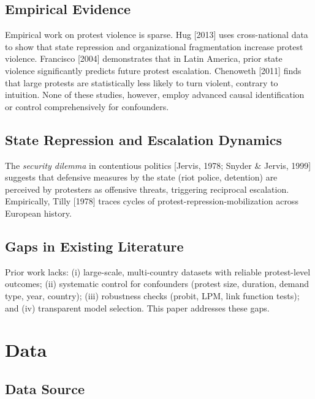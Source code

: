\documentclass[11pt,a4paper]{article}
\begin{document}
\subsection{Empirical Evidence}

Empirical work on protest violence is sparse. Hug [2013] uses cross-national data to show that state repression and organizational fragmentation increase protest violence. Francisco [2004] demonstrates that in Latin America, prior state violence significantly predicts future protest escalation. Chenoweth [2011] finds that large protests are statistically less likely to turn violent, contrary to intuition. None of these studies, however, employ advanced causal identification or control comprehensively for confounders.

\subsection{State Repression and Escalation Dynamics}

The \emph{security dilemma} in contentious politics [Jervis, 1978; Snyder \& Jervis, 1999] suggests that defensive measures by the state (riot police, detention) are perceived by protesters as offensive threats, triggering reciprocal escalation. Empirically, Tilly [1978] traces cycles of protest-repression-mobilization across European history.

\subsection{Gaps in Existing Literature}

Prior work lacks: (i) large-scale, multi-country datasets with reliable protest-level outcomes; (ii) systematic control for confounders (protest size, duration, demand type, year, country); (iii) robustness checks (probit, LPM, link function tests); and (iv) transparent model selection. This paper addresses these gaps.

\section{Data}

\subsection{Data Source}
\end{document}
